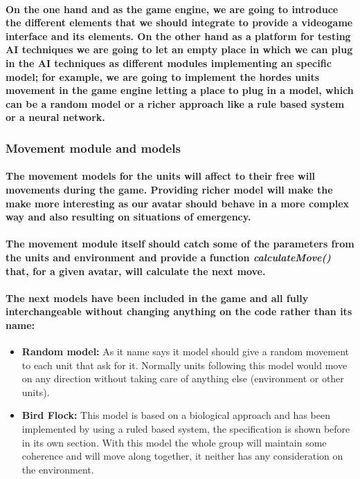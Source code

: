 \documentclass[a4paper,10pt]{article}
\newcommand{\p}[1]{\paragraph{\indent\textnormal{#1}}}
\begin{document}
  \p{On the one hand and as the game engine, we are going to introduce the different elements that we should integrate to provide a videogame interface and its elements. On the other hand as a platform for testing AI techniques we are going to let an empty place in which we can plug in the AI techniques as different modules implementing an specific model; for example, we are going to implement the hordes units movement in the game engine letting a place to plug in a model, which can be a random model or a richer approach like a rule based system or a neural network.}
  
  \subsubsection{Movement module and models}
    
    \p{The movement models for the units will affect to their free will movements during the game. Providing richer model will make the make more interesting as our avatar should behave in a more complex way and also resulting on situations of emergency.}

% 

    \p{The movement module itself should catch some of the parameters from the units and environment and provide a function \textit{calculateMove()} that, for a given avatar, will calculate the next move.}

    \p{The next models have been included in the game and all fully interchangeable without changing anything on the code rather than its name:}

    \begin{itemize}
     \item \textbf{Random model:} As it name says it model should give a random movement to each unit that ask for it. Normally units following this model would move on any direction without taking care of anything else (environment or other units).
     \item \textbf{Bird Flock:} This model is based on a biological approach and has been implemented by using a ruled based system, the specification is shown before in its own section. With this model the whole group will maintain some coherence and will move along together, it neither has any consideration on the environment.
    \end{itemize}
\end{document}
